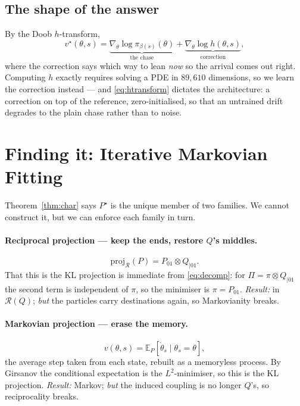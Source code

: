 \documentclass[11pt]{article}
\theoremstyle{definition}
\theoremstyle{plain}
\theoremstyle{remark}
\newcommand{\Eb}{\mathbb{E}}
\newcommand{\Rcal}{\mathcal{R}}
\newcommand{\proj}{\mathrm{proj}}
\begin{document}
\subsection{The shape of the answer}

By the Doob $h$-transform,
\begin{equation}
v^\star(\theta,s) = \underbrace{\nabla_\theta \log \pi_{\beta(s)}(\theta)}_{\text{the chase}}
+ \underbrace{\nabla_\theta \log h(\theta,s)}_{\text{correction}},
\label{eq:htransform}
\end{equation}
where the correction says which way to lean \emph{now} so the arrival comes out
right. Computing $h$ exactly requires solving a PDE in $89{,}610$ dimensions, so
we learn the correction instead --- and \eqref{eq:htransform} dictates the
architecture: a correction on top of the reference, zero-initialised, so that an
untrained drift degrades to the plain chase rather than to noise.

\section{Finding it: Iterative Markovian Fitting}
\label{sec:imf}

Theorem~\ref{thm:char} says $P^\star$ is the unique member of two families. We
cannot construct it, but we can enforce each family in turn.

\paragraph{Reciprocal projection --- keep the ends, restore $Q$'s middles.}
\begin{equation}
\proj_\Rcal(P) = P_{01} \otimes Q_{\mid 01}.
\end{equation}
That this is the KL projection is immediate from \eqref{eq:decomp}: for
$\Pi = \pi \otimes Q_{\mid01}$ the second term is independent of $\pi$, so the
minimiser is $\pi = P_{01}$. \emph{Result:} in $\Rcal(Q)$; \emph{but} the
particles carry destinations again, so Markovianity breaks.

\paragraph{Markovian projection --- erase the memory.}
\begin{equation}
v(\theta,s) = \Eb_P\!\left[\dot\theta_s \mid \theta_s = \theta\right],
\label{eq:markovproj}
\end{equation}
the average step taken from each state, rebuilt as a memoryless process. By
Girsanov the conditional expectation is the $L^2$-minimiser, so this is the KL
projection. \emph{Result:} Markov; \emph{but} the induced coupling is no longer
$Q$'s, so reciprocality breaks.
\end{document}
